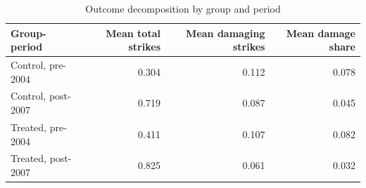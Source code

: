 \begin{table}[!htbp]\centering
\caption{Outcome decomposition by group and period}
\label{tab:decomp}
\begin{tabular}{lrrr}
\toprule
Group-period & Mean total strikes & Mean damaging strikes & Mean damage share \\
\midrule
Control, pre-2004 & 0.304 & 0.112 & 0.078 \\
Control, post-2007 & 0.719 & 0.087 & 0.045 \\
Treated, pre-2004 & 0.411 & 0.107 & 0.082 \\
Treated, post-2007 & 0.825 & 0.061 & 0.032 \\
\bottomrule
\end{tabular}
\end{table}
